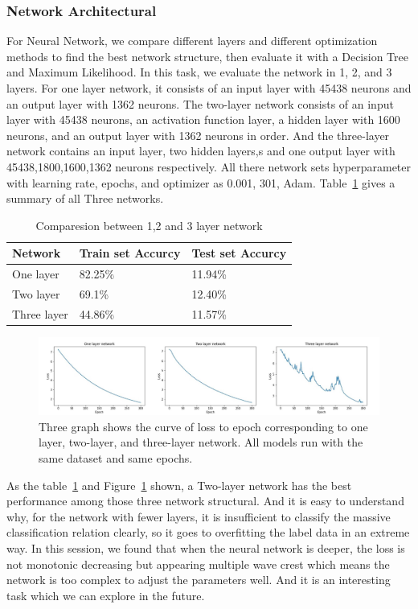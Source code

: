 \documentclass[runningheads]{llncs}
\begin{document}
\subsubsection{Network Architectural}
For Neural Network, we compare different layers and different optimization methods to find the best network structure, then evaluate it with a Decision Tree and Maximum Likelihood. In this task, we evaluate the network in 1, 2, and 3 layers. For one layer network, it consists of an input layer with 45438 neurons and an output layer with 1362 neurons. The two-layer network consists of an input layer with 45438 neurons, an activation function layer, a hidden layer with 1600 neurons, and an output layer with 1362 neurons in order. And the three-layer network contains an input layer, two hidden layers,s and one output layer with 45438,1800,1600,1362 neurons respectively. All there network sets hyperparameter with learning rate, epochs, and optimizer as 0.001, 301, Adam. Table~\ref{tab1} gives a summary of all Three networks. 

\begin{table}
	\caption{Comparesion between 1,2 and 3 layer network}\label{tab1}
	\begin{center}
		\begin{tabular}{|l|l|l|}
			\hline
			Network & Train set Accurcy & Test set Accurcy\\
			\hline
			One layer &  {82.25\%} & 11.94\%\\
			Two layer &  {69.1\%} & 12.40\%\\
			Three layer & {44.86\%} & 11.57\%\\
			\hline
		\end{tabular}
	\end{center}
\end{table}

\begin{figure}
	\includegraphics[width=18cm]{fig5.jpg}
	\caption{Three graph shows the curve of loss to epoch corresponding to one layer, two-layer, and three-layer network. All models run with the same dataset and same epochs.} \label{fig5}
\end{figure}

As the table~\ref{tab1} and Figure~\ref{fig5} shown, a Two-layer network has the best performance among those three network structural. And it is easy to understand why, for the network with fewer layers, it is insufficient to classify the massive classification relation clearly, so it goes to overfitting the label data in an extreme way. In this session, we found that when the neural network is deeper, the loss is not monotonic decreasing but appearing multiple wave crest which means the network is too complex to adjust the parameters well. And it is an interesting task which we can explore in the future.
\end{document}
